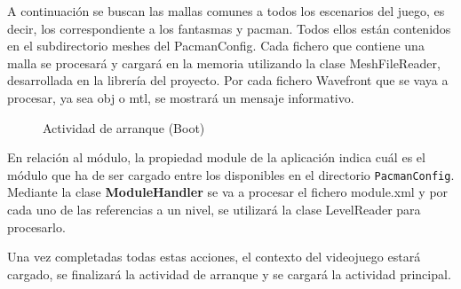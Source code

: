 A continuación se buscan las mallas comunes a todos los escenarios del juego, es decir, los correspondiente a los fantasmas y pacman. Todos ellos están contenidos en el subdirectorio meshes del PacmanConfig. Cada fichero que contiene una malla se procesará y cargará en la memoria utilizando la clase MeshFileReader, desarrollada en la librería del proyecto. Por cada fichero Wavefront que se vaya a procesar, ya sea obj o mtl, se mostrará un mensaje informativo.
\newline 

\begin{figure}[h!]
	\centering	  
	 \hspace*{0.5cm}
	\caption{Actividad de arranque (Boot)}
\end{figure}

En relación al módulo, la propiedad module de la aplicación indica cuál es el módulo que ha de ser cargado entre los disponibles en el directorio \texttt{PacmanConfig}. Mediante la clase \textbf{ModuleHandler} se va a procesar el fichero module.xml y por cada uno de las referencias a un nivel, se utilizará la clase LevelReader para procesarlo.
\newline

Una vez completadas todas estas acciones, el contexto del videojuego estará cargado, se finalizará la actividad de arranque y se cargará la actividad principal.

